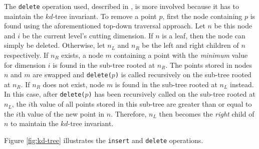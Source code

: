 The \texttt{delete} operation used, described in \cite{kdtree-remove}, is more involved because it has to maintain the $kd$-tree invariant. To remove a point $p$, first the node containing $p$ is found using the aforementioned top-down traversal approach. Let $n$ be this node and $i$ be the current level's cutting dimension. If $n$ is a leaf, then the node can simply be deleted. Otherwise, let $n_L$ and $n_R$ be the left and right children of $n$ respectively. If $n_R$ exists, a node $m$ containing a point with the \textit{minimum} value for dimension $i$ is found in the sub-tree rooted at $n_R$. The points stored in nodes $n$ and $m$ are swapped and \texttt{delete($p$)} is called recursively on the sub-tree rooted at $n_R$. If $n_R$ does not exist, node $m$ is found in the sub-tree rooted at $n_L$ instead. In this case, after \texttt{delete($p$)} has been recursively called on the sub-tree rooted at $n_L$, the $i$th value of all points stored in this sub-tree are greater than or equal to the $i$th value of the new point in $n$. Therefore, $n_L$ then becomes the \textit{right} child of $n$ to maintain the $kd$-tree invariant. 

Figure \ref{fig:kd-tree} illustrates the \texttt{insert} and \texttt{delete} operations.

